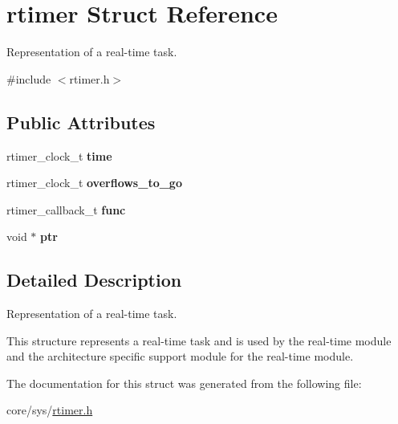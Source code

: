 \hypertarget{structrtimer}{\section{rtimer Struct Reference}
\label{structrtimer}
}


Representation of a real-\/time task.  




{\ttfamily \#include $<$rtimer.\-h$>$}

\subsection*{Public Attributes}
\begin{DoxyCompactItemize}
\item 
\hypertarget{structrtimer_a4a3b4d5f021bfe3026248023e0787423}{rtimer\-\_\-clock\-\_\-t {\bfseries time}}\label{structrtimer_a4a3b4d5f021bfe3026248023e0787423}

\item 
\hypertarget{structrtimer_a8470682ff83caee7e34080545c6a25a6}{rtimer\-\_\-clock\-\_\-t {\bfseries overflows\-\_\-to\-\_\-go}}\label{structrtimer_a8470682ff83caee7e34080545c6a25a6}

\item 
\hypertarget{structrtimer_a7d94e8851e183e8c93e3b7e210eb7212}{rtimer\-\_\-callback\-\_\-t {\bfseries func}}\label{structrtimer_a7d94e8851e183e8c93e3b7e210eb7212}

\item 
\hypertarget{structrtimer_a94cff963392454c4c92ed379b5cf9790}{void $\ast$ {\bfseries ptr}}\label{structrtimer_a94cff963392454c4c92ed379b5cf9790}

\end{DoxyCompactItemize}


\subsection{Detailed Description}
Representation of a real-\/time task. 

This structure represents a real-\/time task and is used by the real-\/time module and the architecture specific support module for the real-\/time module. 

The documentation for this struct was generated from the following file\-:\begin{DoxyCompactItemize}
\item 
core/sys/\hyperlink{rtimer_8h}{rtimer.\-h}\end{DoxyCompactItemize}
